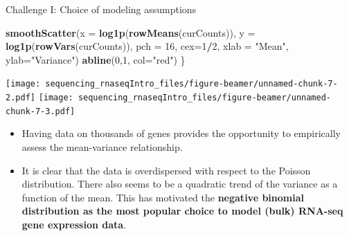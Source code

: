 \documentclass[ignorenonframetext,]{beamer}
\newenvironment{Shaded}{\begin{snugshade}}{\end{snugshade}}
\newcommand{\DataTypeTok}[1]{\textcolor[rgb]{0.13,0.29,0.53}{#1}}
\newcommand{\DecValTok}[1]{\textcolor[rgb]{0.00,0.00,0.81}{#1}}
\newcommand{\KeywordTok}[1]{\textcolor[rgb]{0.13,0.29,0.53}{\textbf{#1}}}
\newcommand{\NormalTok}[1]{#1}
\newcommand{\OperatorTok}[1]{\textcolor[rgb]{0.81,0.36,0.00}{\textbf{#1}}}
\newcommand{\StringTok}[1]{\textcolor[rgb]{0.31,0.60,0.02}{#1}}
\providecommand{\tightlist}{%
  \setlength{\itemsep}{0pt}\setlength{\parskip}{0pt}}
\begin{document}
\begin{frame}[fragile]{Challenge I: Choice of modeling assumptions}
\begin{Shaded}
\begin{Highlighting}[]
  \KeywordTok{smoothScatter}\NormalTok{(}\DataTypeTok{x =} \KeywordTok{log1p}\NormalTok{(}\KeywordTok{rowMeans}\NormalTok{(curCounts)),}
       \DataTypeTok{y =} \KeywordTok{log1p}\NormalTok{(}\KeywordTok{rowVars}\NormalTok{(curCounts)),}
       \DataTypeTok{pch =} \DecValTok{16}\NormalTok{, }\DataTypeTok{cex=}\DecValTok{1}\OperatorTok{/}\DecValTok{2}\NormalTok{,}
       \DataTypeTok{xlab =} \StringTok{"Mean"}\NormalTok{, }\DataTypeTok{ylab=}\StringTok{"Variance"}\NormalTok{)}
  \KeywordTok{abline}\NormalTok{(}\DecValTok{0}\NormalTok{,}\DecValTok{1}\NormalTok{, }\DataTypeTok{col=}\StringTok{"red"}\NormalTok{)}
\NormalTok{\}}
\end{Highlighting}
\end{Shaded}

\texttt{[image: sequencing\_rnaseqIntro\_files/figure-beamer/unnamed-chunk-7-2.pdf]}
\texttt{[image: sequencing\_rnaseqIntro\_files/figure-beamer/unnamed-chunk-7-3.pdf]}

\begin{itemize}
\tightlist
\item
  Having data on thousands of genes provides the opportunity to
  empirically assess the mean-variance relationship.
\item
  It is clear that the data is overdispersed with respect to the Poisson
  distribution. There also seems to be a quadratic trend of the variance
  as a function of the mean. This has motivated the \textbf{negative
  binomial distribution as the most popular choice to model (bulk)
  RNA-seq gene expression data}.
\end{itemize}

\end{frame}
\end{document}
